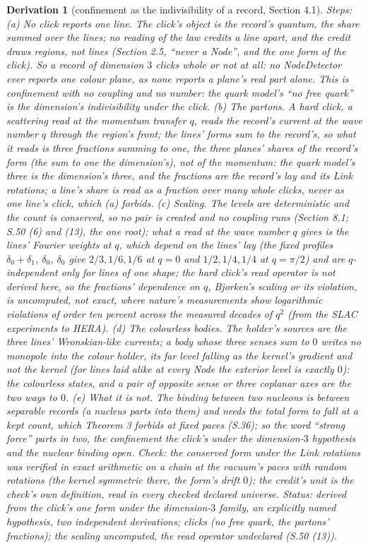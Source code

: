 \documentclass[pdflatex,sn-mathphys-num]{sn-jnl}
\theoremstyle{thmstyleone}
\newtheorem{derivation}{Derivation}
\begin{document}
\begin{derivation}[confinement as the indivisibility of a record, Section 4.1]
\emph{Steps:} (a) \emph{No click reports one line.} The click's object is the record's quantum, the share summed over the lines; no reading of the law credits a line apart, and the credit draws regions, not lines (Section 2.5, ``never a Node'', and the one form of the click). So a record of dimension $3$ clicks whole or not at all: no NodeDetector ever reports one colour plane, as none reports a plane's real part alone. This is confinement with no coupling and no number: the quark model's ``no free quark'' is the dimension's indivisibility under the click. (b) \emph{The partons.} A hard click, a scattering read at the momentum transfer $q$, reads the record's current at the wave number $q$ through the region's front; the lines' forms sum to the record's, so what it reads is three fractions summing to one, the three planes' shares of the record's form (the sum to one the dimension's), not of the momentum: the quark model's three is the dimension's three, and the fractions are the record's lay and its Link rotations; a line's share is read as a fraction over many whole clicks, never as one line's click, which (a) forbids. (c) \emph{Scaling.} The levels are deterministic and the count is conserved, so no pair is created and no coupling runs (Section 8.1; S.50 (6) and (13), the one root); what a read at the wave number $q$ gives is the lines' Fourier weights at $q$, which depend on the lines' lay (the fixed profiles $\delta_0 + \delta_1$, $\delta_0$, $\delta_0$ give $2 / 3, 1 / 6, 1 / 6$ at $q = 0$ and $1 / 2, 1 / 4, 1 / 4$ at $q = \pi / 2$) and are $q$-independent only for lines of one shape; the hard click's read operator is not derived here, so the fractions' dependence on $q$, Bjorken's scaling or its violation, is uncomputed, not exact, where nature's measurements show logarithmic violations of order ten percent across the measured decades of $q^2$ (from the SLAC experiments to HERA). (d) \emph{The colourless bodies.} The holder's sources are the three lines' Wronskian-like currents; a body whose three senses sum to $0$ writes no monopole into the colour holder, its far level falling as the kernel's gradient and not the kernel (for lines laid alike at every Node the exterior level is exactly $0$): the colourless states, and a pair of opposite sense or three coplanar axes are the two ways to $0$. (e) \emph{What it is not.} The binding between two nucleons is between separable records (a nucleus parts into them) and needs the total form to fall at a kept count, which Theorem 3 forbids at fixed paces (S.36); so the word ``strong force'' parts in two, the confinement the click's under the dimension-$3$ hypothesis and the nuclear binding open. \emph{Check:} the conserved form under the Link rotations was verified in exact arithmetic on a chain at the vacuum's paces with random rotations (the kernel symmetric there, the form's drift $0$); the credit's unit is the check's own definition, read in every checked declared universe. \emph{Status:} derived from the click's one form under the dimension-$3$ family, an explicitly named hypothesis, two independent derivations; clicks (no free quark, the partons' fractions); the scaling uncomputed, the read operator undeclared (S.50 (13)).

\end{derivation}
\end{document}
